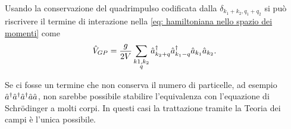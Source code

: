 Usando la conservazione del quadrimpulso codificata dalla $\delta_{k_1 + k_2, q_1 + q_2}$ si può riscrivere il termine di interazione nella \eqref{eq: hamiltoniana nello spazio dei momenti} come
\begin{equation}
    \hat{V}_{GP} = \frac{g}{2V}\sum_{\substack{k1,k_2 \\ q}}\hat{a}^\dagger_{k_2 + q}\hat{a}^\dagger_{k_1 - q}\hat{a}_{k_1}\hat{a}_{k_2}.
\end{equation}
\begin{obs}
    Se ci fosse un termine che non conserva il numero di particelle, ad esempio $\hat{a}^\dagger\hat{a}^\dagger\hat{a}^\dagger\hat{a}\hat{a}$, non sarebbe possibile stabilire l'equivalenza con l'equazione di Schr\"odinger a molti corpi. In questi casi la trattazione tramite la Teoria dei campi è l'unica possibile.
\end{obs}

